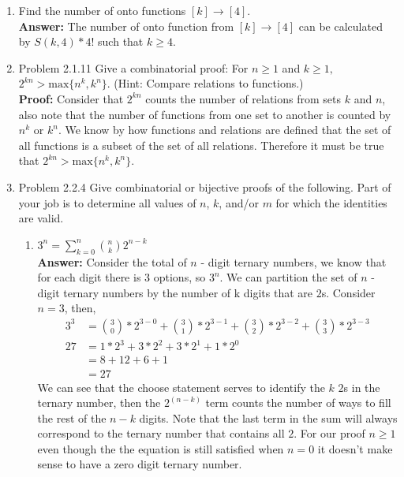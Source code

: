 \documentclass{amsart}
\begin{document}
\begin{enumerate}
\vspace{1in}

\item Find the number of onto functions $[k] \to [4].$\\
\textbf{Answer:} The number of onto function from $[k] \to [4]$ can be calculated by $S(k,4)*4!$ such that $k \geq 4$. \\

\vspace{1in}

\item Problem 2.1.11 Give a combinatorial proof: For $n \geq 1$ and $k \geq 1,$ $2^{kn} > \text{max}\{n^k,k^n\}.$ (Hint: Compare relations to functions.)\\
\textbf{Proof: }Consider that $2^{kn}$ counts the number of relations from sets $k$ and $n$, also note that the number of functions from one set to another is counted by $n^k$ or $k^n$. We know by how functions and relations are defined that the set of all functions is a subset of the set of all relations. Therefore it must be true that $2^{kn} > \text{max}\{n^k,k^n\}$.

\vspace{1in}

\item Problem 2.2.4 Give combinatorial or bijective proofs of the following. Part of your job is to determine all values of $n$, $k$, and/or $m$ for which the identities are valid.\\

\begin{enumerate}
\item $3^n = \displaystyle{\sum_{k=0}^n {n \choose k} 2^{n-k}}$ \\

\textbf{Answer:} Consider the total of $n$ - digit ternary numbers, we know that for each digit there is 3 options, so $3^n$. We can partition the set of $n$  - digit ternary numbers by the number of k digits that are $2$s. Consider $n = 3$, then,
\begin{align*}
3^3 &= {3 \choose 0}*2^{3-0} + {3 \choose 1}*2^{3-1} + {3 \choose 2}*2^{3-2} + {3 \choose 3}*2^{3-3}\\
27 &= 1*2^{3} + 3*2^{2} + 3*2^{1} + 1*2^{0}\\
&= 8 + 12 + 6 + 1\\
&= 27
\end{align*}
We can see that the choose statement serves to identify the $k$ $2$s in the ternary number, then the $2^{(n-k)}$ term counts the number of ways to fill the rest of the $n-k$ digits. Note that the last term in the sum will always correspond to the ternary number that contains all $2$. For our proof $n \geq 1$ even though the the equation is still satisfied when $n = 0$ it doesn't make sense to have a zero digit ternary number. \\



\end{enumerate}
\end{enumerate}
\end{document}
